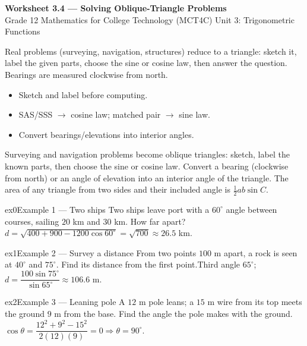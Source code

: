 \documentclass[11pt]{article}
\begin{document}
\begin{center}
{\LARGE\bfseries\color{titleblue}Worksheet 3.4 --- Solving Oblique-Triangle Problems}\\[2pt]
{\small Grade 12 Mathematics for College Technology (MCT4C) \textperiodcentered{} Unit 3: Trigonometric Functions}
\end{center}

\begin{ideabox}
Real problems (surveying, navigation, structures) reduce to a triangle: sketch it, label the given parts, choose the sine or cosine law, then answer the question. Bearings are measured clockwise from north.
\begin{itemize}[leftmargin=*,itemsep=2pt]
  \item Sketch and label before computing.
  \item SAS/SSS $\to$ cosine law; matched pair $\to$ sine law.
  \item Convert bearings/elevations into interior angles.
\end{itemize}
\end{ideabox}

\begin{learnbox}
Surveying and navigation problems become oblique triangles: sketch, label the known parts, then choose the sine or cosine law.
Convert a bearing (clockwise from north) or an angle of elevation into an interior angle of the triangle.
The area of any triangle from two sides and their included angle is $\tfrac12ab\sin C$.
\end{learnbox}


\begin{example}{ex0}{Example 1 --- Two ships}
Two ships leave port with a $60^\circ$ angle between courses, sailing $20$ km and $30$ km. How far apart?\soln $d=\sqrt{400+900-1200\cos60^\circ}=\sqrt{700}\approx26.5$ km.
\end{example}

\begin{example}{ex1}{Example 2 --- Survey a distance}
From two points $100$ m apart, a rock is seen at $40^\circ$ and $75^\circ$. Find its distance from the first point.\soln Third angle $65^\circ$; $d=\dfrac{100\sin75^\circ}{\sin65^\circ}\approx106.6$ m.
\end{example}

\begin{example}{ex2}{Example 3 --- Leaning pole}
A $12$ m pole leans; a $15$ m wire from its top meets the ground $9$ m from the base. Find the angle the pole makes with the ground.\soln $\cos\theta=\dfrac{12^2+9^2-15^2}{2(12)(9)}=0\Rightarrow\theta=90^\circ$.
\end{example}
\end{document}
